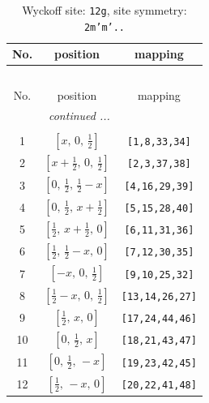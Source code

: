 \documentclass[fleqn,8pt]{jsarticle}
\begin{document}
\begin{longtable}{ccc}
\caption{Wyckoff site: {\tt 12g}, site symmetry: {\tt 2m'm'..}}
 \\
 \hline \hline
No. & position & mapping \\ \hline \endfirsthead

\multicolumn{2}{l}{\tablename\ \thetable{}} \\
 \hline \hline
No. & position & mapping \\ \hline \endhead

 \hline \hline
\multicolumn{2}{r}{\footnotesize\it continued ...} \\ \endfoot

 \hline \hline
\multicolumn{2}{r}{} \\ \endlastfoot

1 & $\left[ x,\, 0,\, \frac{1}{2} \right]$ & {\tt [1,8,33,34]} \\ \hline
2 & $\left[ x + \frac{1}{2},\, 0,\, \frac{1}{2} \right]$ & {\tt [2,3,37,38]} \\ \hline
3 & $\left[ 0,\, \frac{1}{2},\, \frac{1}{2} - x \right]$ & {\tt [4,16,29,39]} \\ \hline
4 & $\left[ 0,\, \frac{1}{2},\, x + \frac{1}{2} \right]$ & {\tt [5,15,28,40]} \\ \hline
5 & $\left[ \frac{1}{2},\, x + \frac{1}{2},\, 0 \right]$ & {\tt [6,11,31,36]} \\ \hline
6 & $\left[ \frac{1}{2},\, \frac{1}{2} - x,\, 0 \right]$ & {\tt [7,12,30,35]} \\ \hline
7 & $\left[ - x,\, 0,\, \frac{1}{2} \right]$ & {\tt [9,10,25,32]} \\ \hline
8 & $\left[ \frac{1}{2} - x,\, 0,\, \frac{1}{2} \right]$ & {\tt [13,14,26,27]} \\ \hline
9 & $\left[ \frac{1}{2},\, x,\, 0 \right]$ & {\tt [17,24,44,46]} \\ \hline
10 & $\left[ 0,\, \frac{1}{2},\, x \right]$ & {\tt [18,21,43,47]} \\ \hline
11 & $\left[ 0,\, \frac{1}{2},\, - x \right]$ & {\tt [19,23,42,45]} \\ \hline
12 & $\left[ \frac{1}{2},\, - x,\, 0 \right]$ & {\tt [20,22,41,48]} \\
\end{longtable}
\renewcommand{\arraystretch}{1.2}
\end{document}
